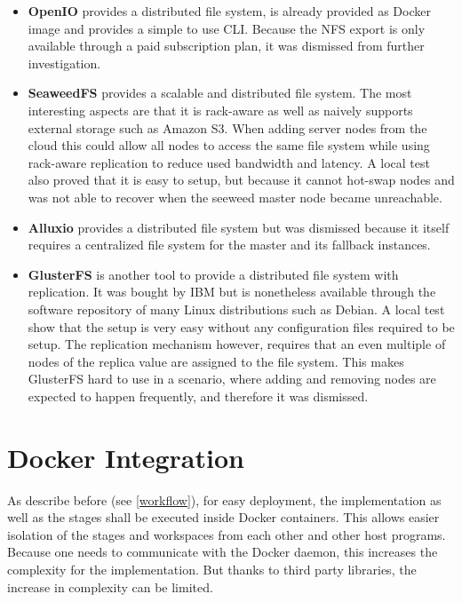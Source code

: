 \begin{itemize}
	\item \textbf{OpenIO}\cite{openio:main} provides a distributed file system, is already provided as Docker image and provides a simple to use CLI. Because the NFS export is only available through a paid subscription plan, it was dismissed from further investigation.
	\item \textbf{SeaweedFS}\cite{seeweedfs:main} provides a scalable and distributed file system. The most interesting aspects are that it is rack-aware as well as naively supports external storage such as Amazon S3. When adding server nodes from the cloud this could allow all nodes to access the same file system while using rack-aware replication to reduce used bandwidth and latency. A local test also proved that it is easy to setup, but because it cannot hot-swap nodes and was not able to recover when the seeweed master node became unreachable.
	\item \textbf{Alluxio}\cite{alluxio:main} provides a distributed file system but was dismissed because it itself requires a centralized file system for the master and its fallback instances.
	\item \textbf{GlusterFS}\cite{glusterfs:main} is another tool to provide a distributed file system with replication. It was bought by IBM but is nonetheless available through the software repository of many Linux distributions such as Debian. A local test show that the setup is very easy without any configuration files required to be setup. The replication mechanism however, requires that an even multiple of nodes of the replica value are assigned to the file system. This makes GlusterFS hard to use in a scenario, where adding and removing nodes are expected to happen frequently, and therefore it was dismissed.
\end{itemize}

\section{Docker Integration}

As describe before (see \autoref{workflow}), for easy deployment, the implementation as well as the stages shall be executed inside Docker\cite{docker:main} containers.
This allows easier isolation of the stages and workspaces from each other and other host programs.
Because one needs to communicate with the Docker daemon, this increases the complexity for the implementation.
But thanks to third party libraries, the increase in complexity can be limited.




